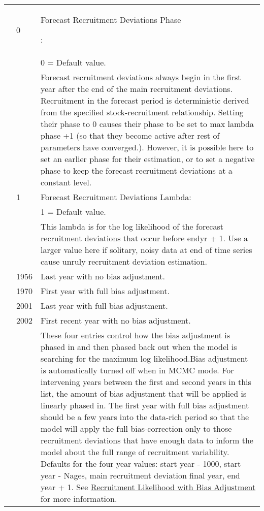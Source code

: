 \begin{longtable}{p{1cm} p{3cm} p{11cm}}
	\Tstrut & 0 & \hypertarget{FcastRecDevPhase}{Forecast Recruitment Deviations Phase}: \\
			&   & 0 = Default value. \\
			&   & Forecast recruitment deviations always begin in the first year after the end of the main recruitment deviations. Recruitment in the forecast period is deterministic derived from the specified stock-recruitment relationship. Setting their phase to 0 causes their phase to be set to max lambda phase +1 (so that they become active after rest of parameters have converged.). However, it is possible here to set an earlier phase for their estimation, or to set a negative phase to keep the forecast recruitment deviations at a constant level. \Bstrut\\

	\Tstrut & 1 & Forecast Recruitment Deviations Lambda: \\
			&   & 1 = Default value. \\
			&   & This lambda is for the log likelihood of the forecast recruitment deviations that occur before endyr + 1. Use a larger value here if solitary, noisy data at end of time series cause unruly recruitment deviation estimation. \\
	
	\Tstrut & 1956 & Last year with no bias adjustment. \\
			& 1970 & First year with full bias adjustment. \\
			& 2001 & Last year with full bias adjustment. \\
			& 2002 & First recent year with no bias adjustment. \\
			& 	   & These four entries control how the bias adjustment is phased in and then phased back out when the model is searching for the maximum log likelihood.Bias adjustment is automatically turned off when in MCMC mode. For intervening years between the first and second years in this list, the amount of bias adjustment that will be applied is linearly phased in. The first year with full bias adjustment should be a few years into the data-rich period so that the model will apply the full bias-correction only to those recruitment deviations that have enough data to inform the model about the full range of recruitment variability. Defaults for the four year values: start year - 1000, start year - Nages, main recruitment deviation final year, end year + 1. See \hyperlink{RecBias}{Recruitment Likelihood with Bias Adjustment} for more information. \\
	

\end{longtable}
